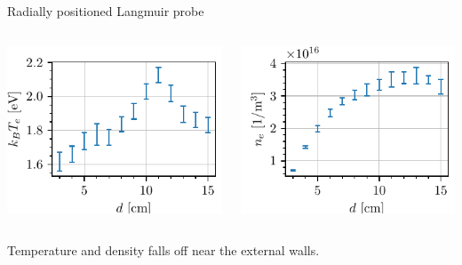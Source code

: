 \documentclass[10pt]{beamer}
\begin{document}
\begin{frame}{Radially positioned Langmuir probe}
    \begin{columns}
        \centering
        \includegraphics[scale=1]{../figures/temperatureeV_position_radial.pdf}

        \centering
        \includegraphics[scale=1]{../figures/density_position_radial.pdf}

    \end{columns}
    \vspace{0.5cm}
    Temperature and density falls off near the external walls.
\end{frame}
\end{document}
